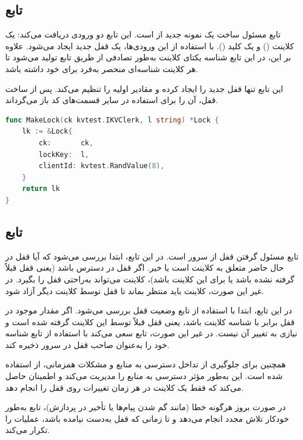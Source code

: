 \subsection*{تابع }

تابع  مسئول ساخت یک نمونه جدید از  است. این تابع دو ورودی دریافت می‌کند: یک کلاینت () و یک کلید (). با استفاده از این ورودی‌ها، یک قفل جدید ایجاد می‌شود. علاوه بر این، در این تابع شناسه یکتای کلاینت به‌طور تصادفی از طریق تابع  تولید می‌شود تا هر کلاینت شناسه‌ای منحصر به‌فرد برای خود داشته باشد.

این تابع تنها قفل جدید را ایجاد کرده و مقادیر اولیه را تنظیم می‌کند. پس از ساخت قفل، آن را برای استفاده در سایر قسمت‌های کد باز می‌گرداند.

\begin{latin}
\begin{lstlisting}[language=Go]
func MakeLock(ck kvtest.IKVClerk, l string) *Lock {
    lk := &Lock{
        ck:       ck,
        lockKey:  l,
        clientId: kvtest.RandValue(8),
    }
    return lk
}
\end{lstlisting}
\end{latin}

\subsection*{تابع }

تابع  مسئول گرفتن قفل از سرور است. در این تابع، ابتدا بررسی می‌شود که آیا قفل در حال حاضر متعلق به کلاینت است یا خیر. اگر قفل در دسترس باشد (یعنی قفل قبلاً گرفته نشده باشد یا برای این کلاینت باشد)، کلاینت می‌تواند به‌راحتی قفل را بگیرد. در غیر این صورت، کلاینت باید منتظر بماند تا قفل توسط کلاینت دیگر آزاد شود.

در این تابع، ابتدا با استفاده از تابع  وضعیت قفل بررسی می‌شود. اگر مقدار موجود در قفل برابر با شناسه کلاینت باشد، یعنی قفل قبلاً توسط این کلاینت گرفته شده است و نیازی به تغییر آن نیست. در غیر این صورت، تابع سعی می‌کند با استفاده از تابع  شناسه خود را به‌عنوان صاحب قفل در سرور ذخیره کند.

همچنین برای جلوگیری از تداخل دسترسی به منابع و مشکلات همزمانی، از  استفاده شده است. این  به‌طور مؤثر دسترسی به منابع را مدیریت می‌کند و اطمینان حاصل می‌کند که فقط یک کلاینت در هر زمان تغییرات روی قفل را انجام دهد.

در صورت بروز هرگونه خطا (مانند گم شدن پیام‌ها یا تأخیر در پردازش)، تابع به‌طور خودکار تلاش مجدد انجام می‌دهد و تا زمانی که قفل به‌دست نیامده باشد، عملیات را تکرار می‌کند.

